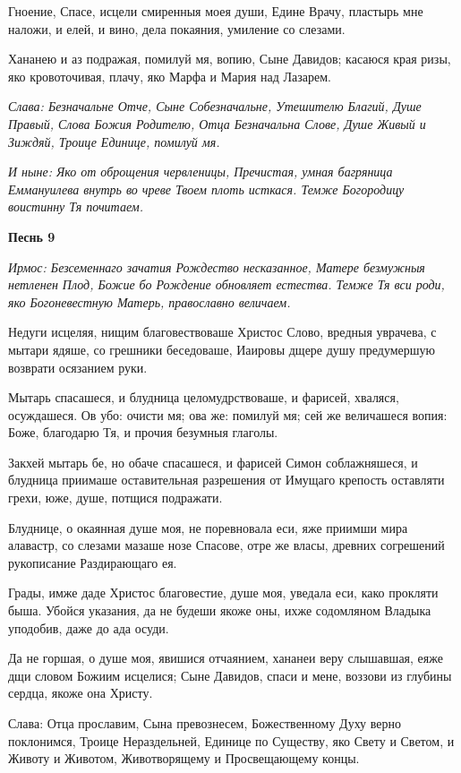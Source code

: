 Гноение, Спасе, исцели смиренныя моея души, Едине Врачу, пластырь мне наложи, и елей, и вино, дела покаяния, умиление со слезами. 

Хананею и аз подражая, помилуй мя, вопию, Сыне Давидов; касаюся края ризы, яко кровоточивая, плачу, яко Марфа и Мария над Лазарем. 

\itshape Слава\normalfont{}: Безначальне Отче, Сыне Собезначальне, Утешителю Благий, Душе Правый, Слова Божия Родителю, Отца Безначальна Слове, Душе Живый и Зиждяй, Троице Единице, помилуй мя. 

\itshape И ныне\normalfont{}: Яко от оброщения червленицы, Пречистая, умная багряница Еммануилева внутрь во чреве Твоем плоть исткася. Темже Богородицу воистинну Тя почитаем. 

\medskip\bfseries Песнь 9\normalfont{}

\itshape Ирмос\normalfont{}: Безсеменнаго зачатия Рождество несказанное, Матере безмужныя нетленен Плод, Божие бо Рождение обновляет естества. Темже Тя вси роди, яко Богоневестную Матерь, православно величаем. 

Недуги исцеляя, нищим благовествоваше Христос Слово, вредныя уврачева, с мытари ядяше, со грешники беседоваше, Иаировы дщере душу предумершую возврати осязанием руки. 

Мытарь спасашеся, и блудница целомудрствоваше, и фарисей, хваляся, осуждашеся. Ов убо: очисти мя; ова же: помилуй мя; сей же величашеся вопия: Боже, благодарю Тя, и прочия безумныя глаголы. 

Закхей мытарь бе, но обаче спасашеся, и фарисей Симон соблажняшеся, и блудница приимаше оставительная разрешения от Имущаго крепость оставляти грехи, юже, душе, потщися подражати. 

Блуднице, о окаянная душе моя, не поревновала еси, яже приимши мира алавастр, со слезами мазаше нозе Спасове, отре же власы, древних согрешений рукописание Раздирающаго ея. 

Грады, имже даде Христос благовестие, душе моя, уведала еси, како прокляти быша. Убойся указания, да не будеши якоже оны, ихже содомляном Владыка уподобив, даже до ада осуди. 

Да не горшая, о душе моя, явишися отчаянием, хананеи веру слышавшая, еяже дщи словом Божиим исцелися; Сыне Давидов, спаси и мене, воззови из глубины сердца, якоже она Христу. 

Слава: Отца прославим, Сына превознесем, Божественному Духу верно поклонимся, Троице Нераздельней, Единице по Существу, яко Свету и Светом, и Животу и Животом, Животворящему и Просвещающему концы. 

